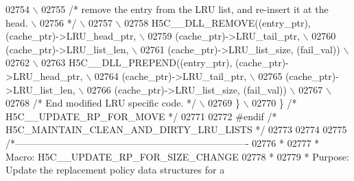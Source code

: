 \begin{DoxyCode}
02754 \textcolor{preprocessor}{                                                                             \(\backslash\)}
02755 \textcolor{preprocessor}{        }\textcolor{comment}{/* remove the entry from the LRU list, and re-insert it at the head. \(\backslash\)}
02756 \textcolor{comment}{     */}\textcolor{preprocessor}{                                                                  \(\backslash\)}
02757 \textcolor{preprocessor}{                                                                             \(\backslash\)}
02758 \textcolor{preprocessor}{            H5C\_\_DLL\_REMOVE((entry\_ptr), (cache\_ptr)->LRU\_head\_ptr,          \(\backslash\)}
02759 \textcolor{preprocessor}{                             (cache\_ptr)->LRU\_tail\_ptr,                      \(\backslash\)}
02760 \textcolor{preprocessor}{                 (cache\_ptr)->LRU\_list\_len,                      \(\backslash\)}
02761 \textcolor{preprocessor}{                             (cache\_ptr)->LRU\_list\_size, (fail\_val))         \(\backslash\)}
02762 \textcolor{preprocessor}{                                                                             \(\backslash\)}
02763 \textcolor{preprocessor}{            H5C\_\_DLL\_PREPEND((entry\_ptr), (cache\_ptr)->LRU\_head\_ptr,         \(\backslash\)}
02764 \textcolor{preprocessor}{                              (cache\_ptr)->LRU\_tail\_ptr,                     \(\backslash\)}
02765 \textcolor{preprocessor}{                  (cache\_ptr)->LRU\_list\_len,                     \(\backslash\)}
02766 \textcolor{preprocessor}{                              (cache\_ptr)->LRU\_list\_size, (fail\_val))        \(\backslash\)}
02767 \textcolor{preprocessor}{                                                                             \(\backslash\)}
02768 \textcolor{preprocessor}{            }\textcolor{comment}{/* End modified LRU specific code. */}\textcolor{preprocessor}{                            \(\backslash\)}
02769 \textcolor{preprocessor}{        \}                                                                    \(\backslash\)}
02770 \textcolor{preprocessor}{\} }\textcolor{comment}{/* H5C\_\_UPDATE\_RP\_FOR\_MOVE */}\textcolor{preprocessor}{}
02771 
02772 \textcolor{preprocessor}{#endif }\textcolor{comment}{/* H5C\_MAINTAIN\_CLEAN\_AND\_DIRTY\_LRU\_LISTS */}\textcolor{preprocessor}{}
02773 
02774 
02775 \textcolor{comment}{/*-------------------------------------------------------------------------}
02776 \textcolor{comment}{ *}
02777 \textcolor{comment}{ * Macro:   H5C\_\_UPDATE\_RP\_FOR\_SIZE\_CHANGE}
02778 \textcolor{comment}{ *}
02779 \textcolor{comment}{ * Purpose:     Update the replacement policy data structures for a}

\end{DoxyCode}
